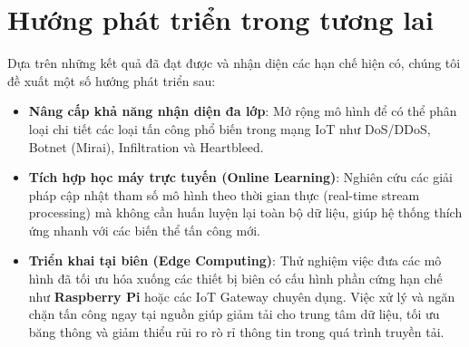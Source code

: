 \section{Hướng phát triển trong tương lai}
Dựa trên những kết quả đã đạt được và nhận diện các hạn chế hiện có, chúng tôi đề xuất một số hướng phát triển sau:
\begin{itemize}
    \item \textbf{Nâng cấp khả năng nhận diện đa lớp}: Mở rộng mô hình để có thể phân loại chi tiết các loại tấn công phổ biến trong mạng IoT như DoS/DDoS, Botnet (Mirai), Infiltration và Heartbleed.
    \item \textbf{Tích hợp học máy trực tuyến (Online Learning)}: Nghiên cứu các giải pháp cập nhật tham số mô hình theo thời gian thực (real-time stream processing) mà không cần huấn luyện lại toàn bộ dữ liệu, giúp hệ thống thích ứng nhanh với các biến thể tấn công mới.
    \item \textbf{Triển khai tại biên (Edge Computing)}: Thử nghiệm việc đưa các mô hình đã tối ưu hóa xuống các thiết bị biên có cấu hình phần cứng hạn chế như \textbf{Raspberry Pi} hoặc các IoT Gateway chuyên dụng. Việc xử lý và ngăn chặn tấn công ngay tại nguồn giúp giảm tải cho trung tâm dữ liệu, tối ưu băng thông và giảm thiểu rủi ro rò rỉ thông tin trong quá trình truyền tải.
\end{itemize}
